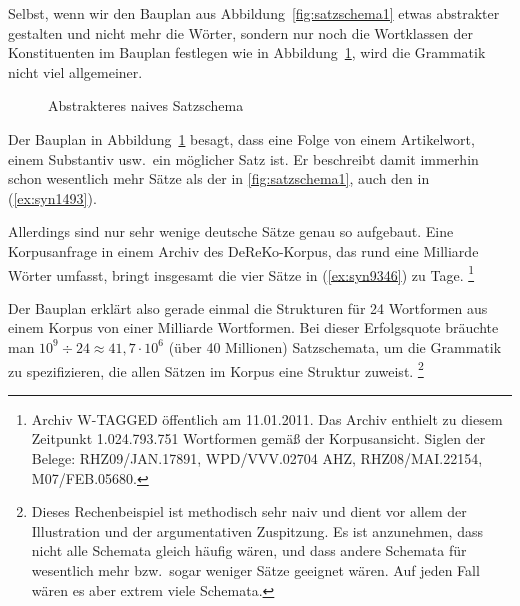 Selbst, wenn wir den Bauplan aus Abbildung~\ref{fig:satzschema1} etwas abstrakter gestalten und nicht mehr die Wörter, sondern nur noch die Wortklassen der Konstituenten im Bauplan festlegen wie in Abbildung~\ref{fig:satzschema2}, wird die Grammatik nicht viel allgemeiner.

\begin{figure}[!htbp]
  \centering
  \caption{Abstrakteres naives Satzschema}
  \label{fig:satzschema2}
\end{figure}

Der Bauplan in Abbildung~\ref{fig:satzschema2} besagt, dass eine Folge von einem Artikelwort, einem Substantiv usw.\ ein möglicher Satz ist.
Er beschreibt damit immerhin schon wesentlich mehr Sätze als der in \ref{fig:satzschema1}, \zB auch den in (\ref{ex:syn1493}).

\begin{exe}
\end{exe}

Allerdings sind nur sehr wenige deutsche Sätze genau so aufgebaut.
Eine Korpusanfrage in einem Archiv des DeReKo-Korpus, das rund eine Milliarde Wörter umfasst, bringt insgesamt die vier Sätze in (\ref{ex:syn9346}) zu Tage.%
\footnote{Archiv W-TAGGED öffentlich am 11.01.2011.
Das Archiv enthielt zu diesem Zeitpunkt 1.024.793.751 Wortformen gemäß der Korpusansicht.
Siglen der Belege: RHZ09/JAN.17891, WPD/VVV.02704 AHZ, RHZ08/MAI.22154, M07/FEB.05680.}

\begin{exe}
  \ex \label{ex:syn9346}
  \begin{xlist}
  \end{xlist}
\end{exe}

Der Bauplan erklärt also gerade einmal die Strukturen für 24 Wortformen aus einem Korpus von einer Milliarde Wortformen.
Bei dieser Erfolgsquote bräuchte man $10^9\div24\approx41,7\cdot10^6$ (über 40 Millionen) Satzschemata, um die Grammatik zu spezifizieren, die allen Sätzen im Korpus eine Struktur zuweist.%
\footnote{Dieses Rechenbeispiel ist methodisch sehr naiv und dient vor allem der Illustration und der argumentativen Zuspitzung.
Es ist \zB anzunehmen, dass nicht alle Schemata gleich häufig wären, und dass andere Schemata für wesentlich mehr bzw.\ sogar weniger Sätze geeignet wären.
Auf jeden Fall wären es aber extrem viele Schemata.}

